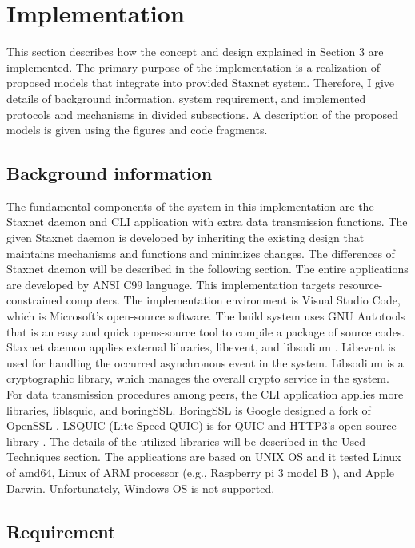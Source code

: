 \chapter{Implementation}
\label{cha:implementation}

This section describes how the concept and design explained in Section 3 are implemented. The primary purpose of the implementation is a realization of proposed models that integrate into provided Staxnet system. Therefore, I give details of background information, system requirement, and implemented protocols and mechanisms in divided subsections. A description of the proposed models is given using the figures and code fragments.

\section{Background information}

The fundamental components of the system in this implementation are the Staxnet daemon and CLI application with extra data transmission functions. The given Staxnet daemon is developed by inheriting the existing design that maintains mechanisms and functions and minimizes changes. The differences of Staxnet daemon will be described in the following section. The entire applications are developed by ANSI C99 language. This implementation targets resource-constrained computers. The implementation environment is Visual Studio Code, which is Microsoft's open-source software. The build system uses GNU Autotools \cite{experimentingwithquic} that is an easy and quick opens-source tool to compile a package of source codes. Staxnet daemon applies external libraries, libevent, and libsodium \cite{Libsodium}. Libevent is used for handling the occurred asynchronous event in the system. Libsodium is a cryptographic library, which manages the overall crypto service in the system. For data transmission procedures among peers, the CLI application applies more libraries, liblsquic, and boringSSL. BoringSSL is Google designed a fork of OpenSSL \cite{BoringSSL}. LSQUIC (Lite Speed QUIC) is for QUIC and HTTP3’s open-source library \cite{lsquic}. The details of the utilized libraries will be described in the Used Techniques section. The applications are based on UNIX OS and it tested Linux of amd64, Linux of ARM processor (e.g., Raspberry pi 3 model B \cite{Raspberry}), and Apple Darwin. Unfortunately, Windows OS is not supported.

\section{Requirement}

